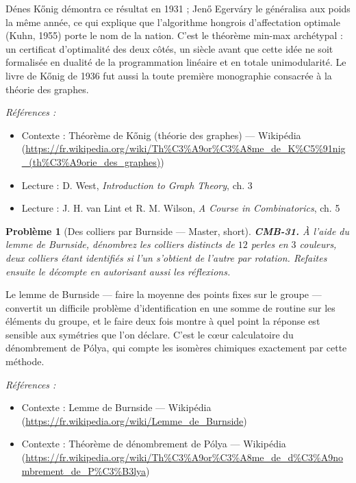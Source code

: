 \documentclass[11pt]{article}
\newtheorem{problem}{Problème}
\newenvironment{refs}{\par\small\noindent\emph{Références :}\begin{itemize}\setlength\itemsep{0pt}}{\end{itemize}\normalsize}
\begin{document}
\noindent Dénes K\H{o}nig démontra ce résultat en 1931 ; Jen\H{o} Egerváry le généralisa aux
poids la même année, ce qui explique que l'algorithme hongrois d'affectation optimale (Kuhn, 1955)
porte le nom de la nation. C'est le théorème min-max archétypal : un certificat d'optimalité des
deux côtés, un siècle avant que cette idée ne soit formalisée en dualité de la programmation
linéaire et en totale unimodularité. Le livre de K\H{o}nig de 1936 fut aussi la toute première
monographie consacrée à la théorie des graphes.

\begin{refs}
\item Contexte : Théorème de K\H{o}nig (théorie des graphes) --- Wikipédia (\url{https://fr.wikipedia.org/wiki/Th%C3%A9or%C3%A8me_de_K%C5%91nig_(th%C3%A9orie_des_graphes)})
\item Lecture : D. West, \textit{Introduction to Graph Theory}, ch. 3
\item Lecture : J. H. van Lint et R. M. Wilson, \textit{A Course in Combinatorics}, ch. 5
\end{refs}

\bigskip

\begin{problem}[{Des colliers par Burnside --- Master, short}]
\textbf{CMB-31.} À l'aide du lemme de Burnside, dénombrez les colliers distincts de $ 12 $ perles en $ 3 $ couleurs, deux colliers étant identifiés si l'un s'obtient de l'autre par rotation. Refaites ensuite le décompte en autorisant aussi les réflexions.
\end{problem}

\noindent Le lemme de Burnside --- faire la moyenne des points fixes sur le groupe --- convertit un difficile problème d'identification en une somme de routine sur les éléments du groupe, et le faire deux fois montre à quel point la réponse est sensible aux symétries que l'on déclare. C'est le c\oe{}ur calculatoire du dénombrement de Pólya, qui compte les isomères chimiques exactement par cette méthode.

\begin{refs}
\item Contexte : Lemme de Burnside --- Wikipédia (\url{https://fr.wikipedia.org/wiki/Lemme_de_Burnside})
\item Contexte : Théorème de dénombrement de Pólya --- Wikipédia (\url{https://fr.wikipedia.org/wiki/Th%C3%A9or%C3%A8me_de_d%C3%A9nombrement_de_P%C3%B3lya})
\end{refs}
\end{document}

